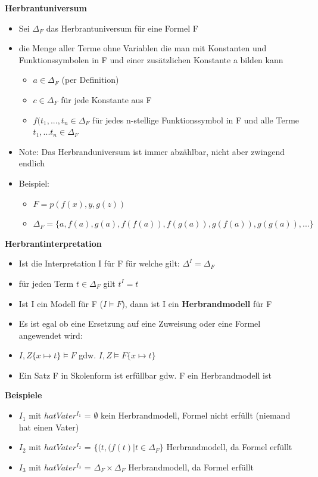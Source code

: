 \documentclass[12pt,a4paper]{article}
\begin{document}
\textbf{Herbrantuniversum}
\begin{itemize}
\item Sei $\Delta_F$ das Herbrantuniversum für eine Formel F
\item die Menge aller Terme ohne Variablen die man mit Konstanten und Funktionssymbolen in F und einer zusätzlichen Konstante a bilden kann
\begin{itemize}
\item $a \in \Delta_F$ (per Definition)
\item $c \in \Delta_F$ für jede Konstante aus F
\item $f(t_1,...,t_n \in \Delta_F$ für jedes n-stellige Funktionssymbol in F und alle Terme $t_1,...t_n \in \Delta_F$
\end{itemize}
\item Note: Das Herbranduniversum ist immer abzählbar, nicht aber zwingend endlich
\item Beispiel:
\begin{itemize}
\item $F = p(f(x),y,g(z))$
\item $\Delta_F = \{a, f(a), g(a), f(f(a)), f(g(a)), g(f(a)), g(g(a)),... \}$
\end{itemize}
\end{itemize}

\textbf{Herbrantinterpretation}
\begin{itemize}
\item Ist die Interpretation I für F für welche gilt: $\Delta^I = \Delta_F$
\item für jeden Term $t \in \Delta_F$ gilt $t^I = t$
\item Ist I ein Modell für F ($I \models F$), dann ist I ein \textbf{Herbrandmodell} für F
\item Es ist egal ob eine Ersetzung auf eine Zuweisung oder eine Formel angewendet wird:
\item $I,Z\{x\mapsto t\} \models F$ gdw. $I,Z \models F\{x\mapsto t\}$
\item Ein Satz F in Skolenform ist erfüllbar gdw. F ein Herbrandmodell ist
\end{itemize}

\textbf{Beispiele}
\begin{itemize}
\item $I_1$ mit $hatVater^{I_1}$ = $\emptyset$ kein Herbrandmodell, Formel nicht erfüllt (niemand hat einen Vater)
\item $I_2$ mit $hatVater^{I_2}$ = $\{(t,(f(t) | t \in \Delta_F \}$ Herbrandmodell, da Formel erfüllt
\item $I_3$ mit $hatVater^{I_3}$ = $\Delta_F \times \Delta_F$ Herbrandmodell, da Formel erfüllt
\end{itemize}
\end{document}

